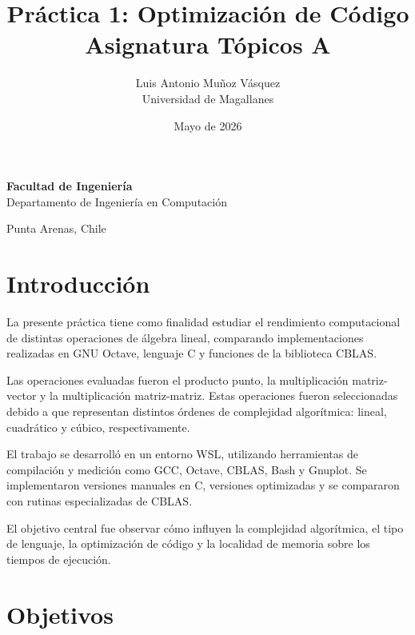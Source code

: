 \documentclass[12pt,letterpaper]{article}
\title{
    \textbf{Práctica 1: Optimización de Código}\\
    \large Asignatura Tópicos A
}
\author{
    Luis Antonio Muñoz Vásquez\\
    Universidad de Magallanes
}
\date{Mayo de 2026}
\begin{document}
\maketitle
\thispagestyle{empty}

\vspace{1cm}

\begin{center}
    \textbf{Facultad de Ingeniería}\\
    Departamento de Ingeniería en Computación
\end{center}

\vfill

\begin{center}
    Punta Arenas, Chile
\end{center}

\newpage

\tableofcontents
\newpage

\section{Introducción}

La presente práctica tiene como finalidad estudiar el rendimiento computacional de distintas operaciones de álgebra lineal, comparando implementaciones realizadas en GNU Octave, lenguaje C y funciones de la biblioteca CBLAS.

Las operaciones evaluadas fueron el producto punto, la multiplicación matriz-vector y la multiplicación matriz-matriz. Estas operaciones fueron seleccionadas debido a que representan distintos órdenes de complejidad algorítmica: lineal, cuadrático y cúbico, respectivamente.

El trabajo se desarrolló en un entorno WSL, utilizando herramientas de compilación y medición como GCC, Octave, CBLAS, Bash y Gnuplot. Se implementaron versiones manuales en C, versiones optimizadas y se compararon con rutinas especializadas de CBLAS.

El objetivo central fue observar cómo influyen la complejidad algorítmica, el tipo de lenguaje, la optimización de código y la localidad de memoria sobre los tiempos de ejecución.

\section{Objetivos}
\end{document}
